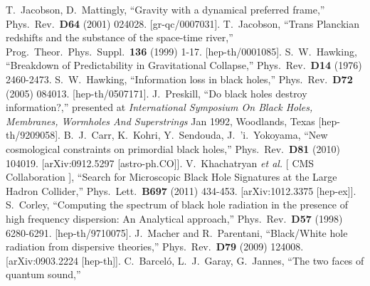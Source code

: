 \documentclass[12pt]{article}
\begin{document}
\begin{thebibliography}{666}
  T.~Jacobson, D.~Mattingly,
  ``Gravity with a dynamical preferred frame,''
  Phys.\ Rev.\  {\bf D64 } (2001)  024028.
  [gr-qc/0007031].
  T.~Jacobson,
  ``Trans Planckian redshifts and the substance of the space-time river,''
  Prog.\ Theor.\ Phys.\ Suppl.\  {\bf 136 } (1999)  1-17.
  [hep-th/0001085].
  S.~W.~Hawking,
  ``Breakdown of Predictability in Gravitational Collapse,''
  Phys.\ Rev.\  {\bf D14 } (1976)  2460-2473.
  S.~W.~Hawking,
 ``Information loss in black holes,''
  Phys.\ Rev.\  {\bf D72 } (2005)  084013.
  [hep-th/0507171].
  J.~Preskill,
  ``Do black holes destroy information?,'' presented at
{\it International Symposium On Black Holes, Membranes, Wormholes And Superstrings}
Jan 1992, Woodlands, Texas
  [hep-th/9209058].
  B.~J.~Carr, K.~Kohri, Y.~Sendouda, J.~'i.~Yokoyama,
  ``New cosmological constraints on primordial black holes,''
  Phys.\ Rev.\  {\bf D81 } (2010)  104019.
  [arXiv:0912.5297 [astro-ph.CO]].
  V.~Khachatryan {\it et al.} [ CMS Collaboration ],
  ``Search for Microscopic Black Hole Signatures at the Large Hadron Collider,''
  Phys.\ Lett.\  {\bf B697 } (2011)  434-453.
  [arXiv:1012.3375 [hep-ex]].
  S.~Corley,
  ``Computing the spectrum of black hole radiation in the presence of high
frequency dispersion: An Analytical approach,''
  Phys.\ Rev.\  {\bf D57 } (1998)  6280-6291.
  [hep-th/9710075].
  J.~Macher and R.~Parentani,
  ``Black/White hole radiation from dispersive theories,''
  Phys.\ Rev.\  {\bf D79 } (2009)  124008.
  [arXiv:0903.2224 [hep-th]].
  C.~Barcel\'o, L.~J.~Garay, G.~Jannes,
  ``The two faces of quantum sound,''

\end{thebibliography}
\end{document}
